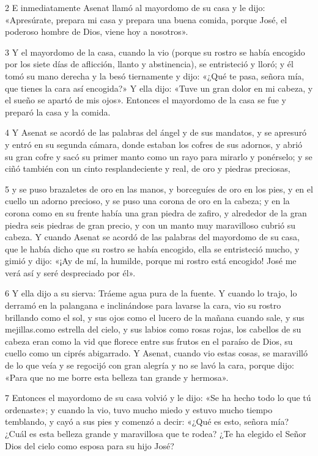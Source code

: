 \par 2 E inmediatamente Asenat llamó al mayordomo de su casa y le dijo: «Apresúrate, prepara mi casa y prepara una buena comida, porque José, el poderoso hombre de Dios, viene hoy a nosotros».

\par 3 Y el mayordomo de la casa, cuando la vio (porque su rostro se había encogido por los siete días de aflicción, llanto y abstinencia), se entristeció y lloró; y él tomó su mano derecha y la besó tiernamente y dijo: «¿Qué te pasa, señora mía, que tienes la cara así encogida?» Y ella dijo: «Tuve un gran dolor en mi cabeza, y el sueño se apartó de mis ojos». Entonces el mayordomo de la casa se fue y preparó la casa y la comida.

\par 4 Y Asenat se acordó de las palabras del ángel y de sus mandatos, y se apresuró y entró en su segunda cámara, donde estaban los cofres de sus adornos, y abrió su gran cofre y sacó su primer manto como un rayo para mirarlo y ponérselo; y se ciñó también con un cinto resplandeciente y real, de oro y piedras preciosas,

\par 5 y se puso brazaletes de oro en las manos, y borceguíes de oro en los pies, y en el cuello un adorno precioso, y se puso una corona de oro en la cabeza; y en la corona como en su frente había una gran piedra de zafiro, y alrededor de la gran piedra seis piedras de gran precio, y con un manto muy maravilloso cubrió su cabeza. Y cuando Asenat se acordó de las palabras del mayordomo de su casa, que le había dicho que su rostro se había encogido, ella se entristeció mucho, y gimió y dijo: «¡Ay de mí, la humilde, porque mi rostro está encogido! José me verá así y seré despreciado por él».

\par 6 Y ella dijo a su sierva: Tráeme agua pura de la fuente. Y cuando lo trajo, lo derramó en la palangana e inclinándose para lavarse la cara, vio su rostro brillando como el sol, y sus ojos como el lucero de la mañana cuando sale, y sus mejillas.como estrella del cielo, y sus labios como rosas rojas, los cabellos de su cabeza eran como la vid que florece entre sus frutos en el paraíso de Dios, su cuello como un ciprés abigarrado. Y Asenat, cuando vio estas cosas, se maravilló de lo que veía y se regocijó con gran alegría y no se lavó la cara, porque dijo: «Para que no me borre esta belleza tan grande y hermosa».

\par 7 Entonces el mayordomo de su casa volvió y le dijo: «Se ha hecho todo lo que tú ordenaste»; y cuando la vio, tuvo mucho miedo y estuvo mucho tiempo temblando, y cayó a sus pies y comenzó a decir: «¿Qué es esto, señora mía? ¿Cuál es esta belleza grande y maravillosa que te rodea? ¿Te ha elegido el Señor Dios del cielo como esposa para su hijo José?

